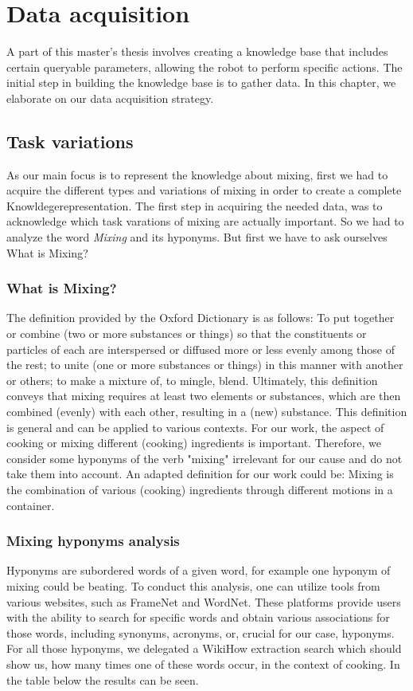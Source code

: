 \chapter*{Data acquisition}
A part of this master's thesis involves creating a knowledge base that includes certain queryable parameters, allowing the robot to perform specific actions. The initial step in building the knowledge base is to gather data. In this chapter, we elaborate on our data acquisition strategy.
\section*{Task variations}
	As our main focus is to represent the knowledge about mixing, first we had to acquire the different types and variations of mixing in order to create a complete Knowldegerepresentation. The first step in acquiring the needed data, was to acknowledge which task varations of mixing are actually important. 
  So we had to analyze the word \textit{Mixing} and its hyponyms. But first we have to ask ourselves What is Mixing?
  \subsection*{What is Mixing?}
  The definition provided by the Oxford Dictionary is as follows: To put together or combine (two or more substances or things) so that the constituents or particles of each are interspersed or diffused more or less evenly among those of the rest; to unite (one or more substances or things) in this manner with another or others; to make a mixture of, to mingle, blend.
  Ultimately, this definition conveys that mixing requires at least two elements or substances, which are then combined (evenly) with each other, resulting in a (new) substance.
  This definition is general and can be applied to various contexts. For our work, the aspect of cooking or mixing different (cooking) ingredients is important. Therefore, we consider some hyponyms of the verb "mixing" irrelevant for our cause and do not take them into account.
  An adapted definition for our work could be: Mixing is the combination of various (cooking) ingredients through different motions in a container.
  
  \subsection*{Mixing hyponyms analysis} 
	Hyponyms are subordered words of a given word, for example one hyponym of mixing could be beating. 
  To conduct this analysis, one can utilize tools from various websites, such as FrameNet and WordNet. These platforms provide users with the ability to search for specific words and obtain various associations for those words, including synonyms, acronyms, or, crucial for our case, hyponyms.	
  For all those hyponyms, we delegated a WikiHow extraction search which should show us, how many times one of these words occur, in the context of cooking.
	In the table below the results can be seen.
	
